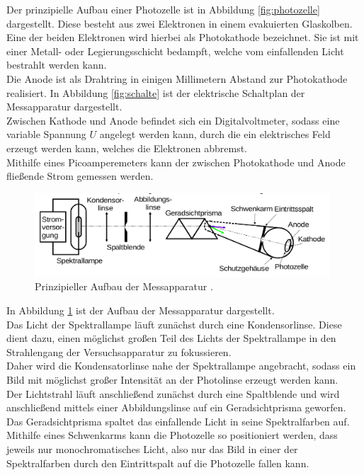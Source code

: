 Der prinzipielle Aufbau einer Photozelle ist in Abbildung \ref{fig:photozelle} dargestellt.
Diese besteht aus zwei Elektronen in einem evakuierten Glaskolben.\\ Eine der beiden Elektronen wird hierbei als Photokathode bezeichnet. Sie ist mit einer Metall- oder Legierungsschicht bedampft, welche vom einfallenden Licht bestrahlt werden kann.\\
Die Anode ist als Drahtring in einigen Millimetern Abstand zur Photokathode realisiert.
In Abbildung \ref{fig:schalte} ist der elektrische Schaltplan der Messapparatur dargestellt.\\
Zwischen Kathode und Anode befindet sich ein Digitalvoltmeter, sodass eine variable Spannung $U$ angelegt werden kann, durch die ein elektrisches Feld erzeugt werden kann, welches die Elektronen abbremst.\\
Mithilfe eines Picoamperemeters kann der zwischen Photokathode und Anode fließende Strom gemessen werden.\\
\begin{figure}
  \centering
  \includegraphics[width=0.98\textwidth]{Bilder/versuchsaufbau.png}
  \caption{Prinzipieller Aufbau der Messapparatur \cite{Anleitung}.}
  \label{fig:aufbau}
\end{figure}
In Abbildung \ref{fig:aufbau} ist der Aufbau der Messapparatur dargestellt.\\
Das Licht der Spektrallampe läuft zunächst durch eine Kondensorlinse. Diese dient dazu, einen möglichst großen Teil des Lichts der Spektrallampe in den Strahlengang der Versuchsapparatur zu fokussieren.\\
Daher wird die Kondensatorlinse nahe der Spektrallampe angebracht, sodass ein Bild mit möglichst großer Intensität an der Photolinse erzeugt werden kann.\\ Der Lichtstrahl läuft anschließend zunächst durch eine Spaltblende und wird anschließend mittels einer Abbildungslinse auf ein Geradsichtprisma geworfen. Das Geradsichtprisma spaltet das einfallende Licht in seine Spektralfarben auf.\\
Mithilfe eines Schwenkarms kann die Photozelle so positioniert werden, dass jeweils nur monochromatisches Licht, also nur das Bild in einer der Spektralfarben durch den Eintrittspalt auf die Photozelle fallen kann.
